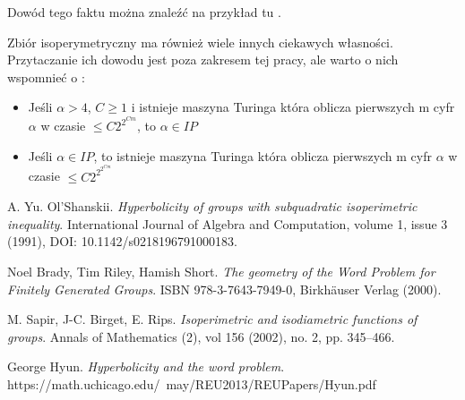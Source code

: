 \documentclass[licencjacka]{pracamgr}
\begin{document}
Dowód tego faktu można znaleźć na przykład tu \cite{bib:geometry_of_word_problem_fin_gen_groups}.

Zbiór isoperymetryczny ma również wiele innych ciekawych własności. Przytaczanie ich dowodu jest poza zakresem tej pracy, ale warto o nich wspomnieć o \cite{bib:isoperimetric_set_turing_machines}:

\begin{itemize}

\item Jeśli $\alpha > 4$, $C \geq 1$ i istnieje maszyna Turinga która oblicza pierwszych m cyfr  $\alpha$ w czasie $\leq C 2^{2^{Cm}}$, to $\alpha \in IP$
\item Jeśli $\alpha \in IP$, to istnieje maszyna Turinga która oblicza pierwszych m cyfr $\alpha$ w czasie $\leq C2^{2^{2^{Cm}}}$

\end{itemize}


\begin{thebibliography}{99}

 A. Yu. Ol'Shanskii. \textit{Hyperbolicity of groups with subquadratic isoperimetric inequality}. International Journal of Algebra and Computation, volume 1, issue 3 (1991), DOI: 10.1142/s0218196791000183.

 Noel Brady, Tim Riley, Hamish Short. \textit{The geometry of the Word Problem for Finitely Generated Groups}. ISBN 978-3-7643-7949-0, Birkhäuser Verlag (2000).

 M. Sapir, J-C. Birget, E. Rips. \textit{Isoperimetric and isodiametric functions of groups}. Annals of Mathematics (2), vol 156 (2002), no. 2, pp. 345–466.

 George Hyun. \textit{Hyperbolicity and the word problem}. https://math.uchicago.edu/~may/REU2013/REUPapers/Hyun.pdf

\end{thebibliography}
\end{document}
